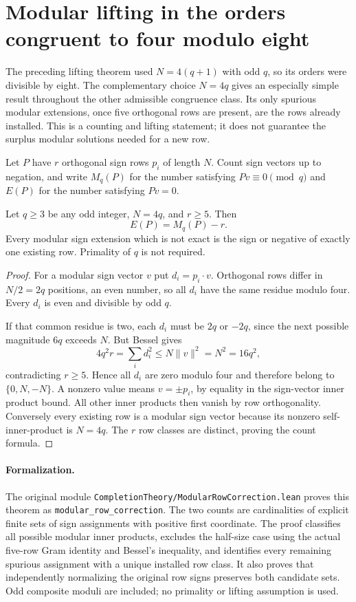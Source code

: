 \section{Modular lifting in the orders congruent to four modulo eight}
\label{sec:four-mod-eight-lifting}

The preceding lifting theorem used $N=4(q+1)$ with odd $q$, so its
orders were divisible by eight. The complementary choice $N=4q$
gives an especially simple result throughout the other admissible
congruence class. Its only spurious modular extensions, once five
orthogonal rows are present, are the rows already installed.
This is a counting and lifting statement; it does not guarantee the
surplus modular solutions needed for a new row.

Let $P$ have $r$ orthogonal sign rows $p_i$ of length $N$. Count sign
vectors up to negation, and write $M_q(P)$ for the number satisfying
$Pv\equiv0\pmod q$ and $E(P)$ for the number satisfying $Pv=0$.

\begin{theorem}
Let $q\ge3$ be any odd integer, $N=4q$, and $r\ge5$. Then
\[
 \boxed{E(P)=M_q(P)-r.}
\]
Every modular sign extension which is not exact is the sign or
negative of exactly one existing row. Primality of $q$ is not required.
\end{theorem}
\begin{proof}
For a modular sign vector $v$ put $d_i=p_i\cdot v$.
Orthogonal rows differ in $N/2=2q$ positions, an even number, so
all $d_i$ have the same residue modulo four. Every $d_i$ is even
and divisible by odd $q$.

If that common residue is two, each $d_i$ must be $2q$ or $-2q$,
since the next possible magnitude $6q$ exceeds $N$. But Bessel gives
\[
 4q^2r=\sum_i d_i^2\le N\|v\|^2=N^2=16q^2,
\]
contradicting $r\ge5$. Hence all $d_i$ are zero modulo four and
therefore belong to $\{0,N,-N\}$. A nonzero value means
$v=\pm p_i$, by equality in the sign-vector inner product bound.
All other inner products then vanish by row orthogonality.
Conversely every existing row is a modular sign vector because its
nonzero self-inner-product is $N=4q$. The $r$ row classes are distinct,
proving the count formula.
\end{proof}

\paragraph{Formalization.}
The original module
\texttt{CompletionTheory/\allowbreak ModularRowCorrection.lean}
proves this theorem as
\texttt{modular\_\allowbreak row\_\allowbreak correction}.
The two counts are cardinalities of explicit finite sets of sign
assignments with positive first coordinate. The proof classifies
all possible modular inner products, excludes the half-size case
using the actual five-row Gram identity and Bessel's inequality,
and identifies every remaining spurious assignment with a unique
installed row class. It also proves that independently normalizing
the original row signs preserves both candidate sets. Odd composite
moduli are included; no primality or lifting assumption is used.

